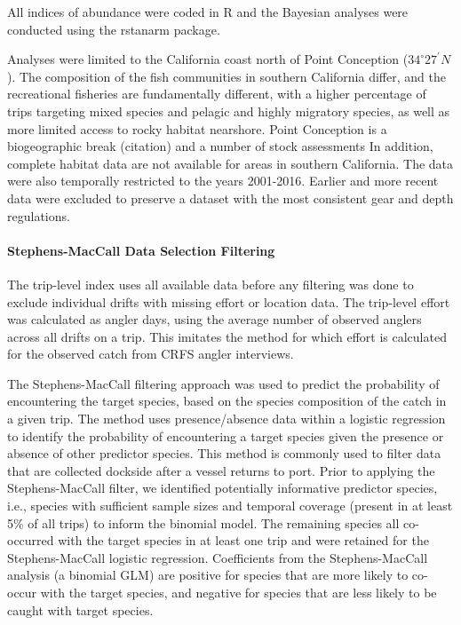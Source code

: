 \documentclass[preprint, 3p,
authoryear]{elsarticle} %
\begin{document}
All indices of abundance were coded in R and the Bayesian analyses were
conducted using the rstanarm package.

Analyses were limited to the California coast north of Point Conception
(\(34^\circ 27^\prime N\)). The composition of the fish communities in
southern California differ, and the recreational fisheries are
fundamentally different, with a higher percentage of trips targeting
mixed species and pelagic and highly migratory species, as well as more
limited access to rocky habitat nearshore. Point Conception is a
biogeographic break (citation) and a number of stock assessments In
addition, complete habitat data are not available for areas in southern
California. The data were also temporally restricted to the years
2001-2016. Earlier and more recent data were excluded to preserve a
dataset with the most consistent gear and depth regulations.

\hypertarget{stephens-maccall-data-selection-filtering}{%
\paragraph{Stephens-MacCall Data Selection
Filtering}\label{stephens-maccall-data-selection-filtering}}

The trip-level index uses all available data before any filtering was
done to exclude individual drifts with missing effort or location data.
The trip-level effort was calculated as angler days, using the average
number of observed anglers across all drifts on a trip. This imitates
the method for which effort is calculated for the observed catch from
CRFS angler interviews.

The Stephens-MacCall \citeyearpar{Stephens2004} filtering approach was
used to predict the probability of encountering the target species,
based on the species composition of the catch in a given trip. The
method uses presence/absence data within a logistic regression to
identify the probability of encountering a target species given the
presence or absence of other predictor species. This method is commonly
used to filter data that are collected dockside after a vessel returns
to port. Prior to applying the Stephens-MacCall filter, we identified
potentially informative predictor species, i.e., species with sufficient
sample sizes and temporal coverage (present in at least 5\% of all
trips) to inform the binomial model. The remaining species all
co-occurred with the target species in at least one trip and were
retained for the Stephens-MacCall logistic regression. Coefficients from
the Stephens-MacCall analysis (a binomial GLM) are positive for species
that are more likely to co-occur with the target species, and negative
for species that are less likely to be caught with target species.
\end{document}
